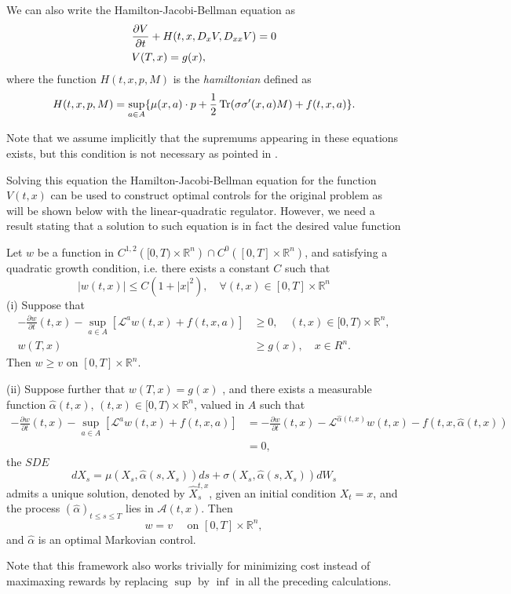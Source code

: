 We can also write the Hamilton-Jacobi-Bellman equation as 
\begin{equation}
		\begin{split}
		&\frac{\partial V}{\partial t}+H(t,x,D_x V,D_{xx} V)=0\\
		&V(T,x)=g(x),
	\end{split}
\end{equation}
where the function $H(t,x,p,M)$ is the \textit{hamiltonian} defined as
\begin{equation}
	H(t,x,p,M)=\sup_{a\in A}\{\mu(x,a)\cdot p+\frac{1}{2}\operatorname{Tr} (\sigma\sigma'(x,a)M)+f(t,x,a)\}.
\end{equation}

Note that we assume implicitly that the supremums appearing in these equations exists, but this condition is not necessary as pointed in \cite{pham_continuous-time_2009}.

Solving this equation the Hamilton-Jacobi-Bellman equation for the function $V(t,x)$ can be used to construct optimal controls for the original problem as will be shown below with the linear-quadratic regulator. However, we need a result stating that a solution to such equation is in fact the desired value function
\begin{thm}
	Let $w$ be a function in $C^{1,2}\left([0, T) \times \mathbb{R}^n\right) \cap C^0\left([0, T] \times \mathbb{R}^n\right)$, and satisfying a quadratic growth condition, i.e. there exists a constant $C$ such that
	$$
	|w(t, x)| \leq C\left(1+|x|^2\right), \quad \forall(t, x) \in[0, T] \times \mathbb{R}^n
	$$
	(i) Suppose that
	$$
	\begin{aligned}
		-\frac{\partial w}{\partial t}(t, x)-\sup _{a \in A}\left[\mathcal{L}^a w(t, x)+f(t, x, a)\right] & \geq 0, \quad(t, x) \in[0, T) \times \mathbb{R}^n, \\
		w(T, x) & \geq g(x), \quad x \in R^n .
	\end{aligned}
	$$
	Then $w \geq v$ on $[0, T] \times \mathbb{R}^n$.
	
	(ii) Suppose further that $w(T,x)=g(x)$ , and there exists a measurable function $\hat{\alpha}(t, x)$, $(t, x) \in[0, T) \times \mathbb{R}^n$, valued in $A$ such that
	$$
	\begin{aligned}
		-\frac{\partial w}{\partial t}(t, x)-\sup _{a \in A}\left[\mathcal{L}^a w(t, x)+f(t, x, a)\right] & =-\frac{\partial w}{\partial t}(t, x)-\mathcal{L}^{\hat{\alpha}(t, x)} w(t, x)-f(t, x, \hat{\alpha}(t, x)) \\
		& =0,
	\end{aligned}
	$$
	the $S D E$
	$$
	d X_s=\mu\left(X_s, \hat{\alpha}\left(s, X_s\right)\right) d s+\sigma\left(X_s, \hat{\alpha}\left(s, X_s\right)\right) d W_s
	$$
	admits a unique solution, denoted by $\hat{X}_s^{t, x}$, given an initial condition $X_t=x$, and the process $\left(\hat{\alpha} \right)_{t \leq s \leq T}$ lies in $\mathcal{A}(t, x)$. Then
	$$
	w=v \quad \text { on }[0, T] \times \mathbb{R}^n,
	$$
	and $\hat{\alpha}$ is an optimal Markovian control.
\end{thm}
Note that this framework also works trivially for minimizing cost instead of maximaxing rewards by replacing $\sup$ by $\inf$ in all the preceding calculations.
